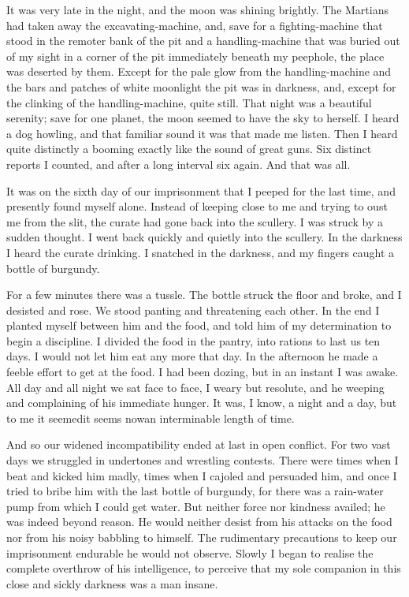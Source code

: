 It was very late in the night, and the moon was shining brightly.
The Martians had taken away the excavating-machine, and, save for a
fighting-machine that stood in the remoter bank of the pit and a
handling-machine that was buried out of my sight in a corner of the
pit immediately beneath my peephole, the place was deserted by
them. Except for the pale glow from the handling-machine and the
bars and patches of white moonlight the pit was in darkness, and,
except for the clinking of the handling-machine, quite still. That
night was a beautiful serenity; save for one planet, the moon
seemed to have the sky to herself. I heard a dog howling, and that
familiar sound it was that made me listen. Then I heard quite
distinctly a booming exactly like the sound of great guns. Six
distinct reports I counted, and after a long interval six again.
And that was all.

It was on the sixth day of our imprisonment that I peeped for the
last time, and presently found myself alone. Instead of keeping
close to me and trying to oust me from the slit, the curate had
gone back into the scullery. I was struck by a sudden thought. I
went back quickly and quietly into the scullery. In the darkness I
heard the curate drinking. I snatched in the darkness, and my
fingers caught a bottle of burgundy.

For a few minutes there was a tussle. The bottle struck the floor
and broke, and I desisted and rose. We stood panting and
threatening each other. In the end I planted myself between him and
the food, and told him of my determination to begin a discipline. I
divided the food in the pantry, into rations to last us ten days. I
would not let him eat any more that day. In the afternoon he made a
feeble effort to get at the food. I had been dozing, but in an
instant I was awake. All day and all night we sat face to face, I
weary but resolute, and he weeping and complaining of his immediate
hunger. It was, I know, a night and a day, but to me it seemed\dash{}it
seems now\dash{}an interminable length of time.

And so our widened incompatibility ended at last in open conflict.
For two vast days we struggled in undertones and wrestling
contests. There were times when I beat and kicked him madly, times
when I cajoled and persuaded him, and once I tried to bribe him
with the last bottle of burgundy, for there was a rain-water pump
from which I could get water. But neither force nor kindness
availed; he was indeed beyond reason. He would neither desist from
his attacks on the food nor from his noisy babbling to himself. The
rudimentary precautions to keep our imprisonment endurable he would
not observe. Slowly I began to realise the complete overthrow of
his intelligence, to perceive that my sole companion in this close
and sickly darkness was a man insane.

